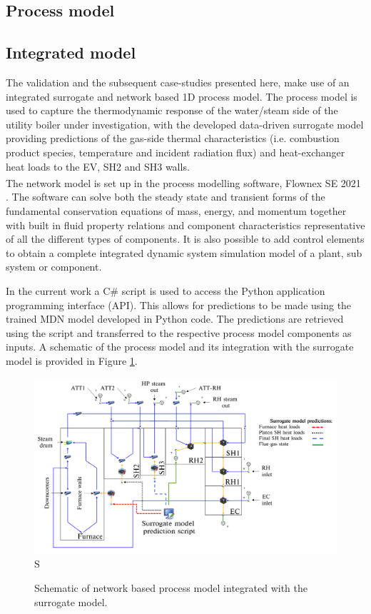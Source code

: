 \documentclass[a4paper,fleqn]{cas-sc}
\begin{document}
\subsection{Process model}

\subsection{Integrated model}
The validation and the subsequent case-studies presented here, make use of an integrated surrogate and network based 1D process model. The process model is used to capture the thermodynamic response of the water/steam side of the utility boiler under investigation, with the developed data-driven surrogate model providing predictions of the gas-side thermal characteristics (i.e. combustion product species, temperature and incident radiation flux) and heat-exchanger heat loads to the EV, SH2 and SH3 walls.\\

The network model is set up in the process modelling software, Flownex SE\textsuperscript{\textregistered} 2021 \cite{flownex}.  The software can solve both the steady state and transient forms of the fundamental conservation equations of mass, energy, and momentum together with built in fluid property relations and component characteristics representative of all the different types of components.  It is also possible to add control elements to obtain a complete integrated dynamic system simulation model of a plant, sub system or component. 

In the current work a C\# script is used to access the Python application programming interface (API). This allows for predictions to be made using the trained MDN model developed in Python code. The predictions are retrieved using the script and transferred to the respective process model components as inputs. A schematic of the process model and its integration with the surrogate model is provided in Figure \ref{fig_int_model}.\\
\begin{figure}[h!]
	\centering
		\includegraphics[scale=0.15]{INTEGRATED_MODEL}S
	  \caption{Schematic of network based process model integrated with the surrogate model.}\label{fig_int_model}
\end{figure}
\end{document}
